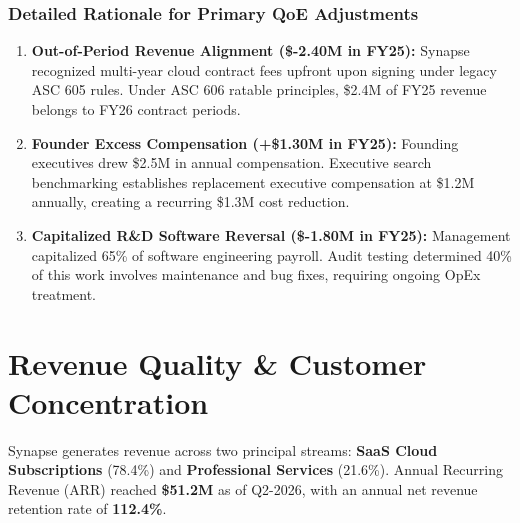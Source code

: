 \documentclass[10pt,a4paper,oneside]{scrreprt}
\begin{document}
\vspace{0.02cm}

\subsection*{Detailed Rationale for Primary QoE Adjustments}

\begin{enumerate}[label=\textbf{\arabic*.}, leftmargin=1.4em, itemsep=0.5pt, parsep=0pt]
  \item \textbf{Out-of-Period Revenue Alignment (\$-2.40M in FY25):} Synapse recognized multi-year cloud contract fees upfront upon signing under legacy ASC 605 rules. Under ASC 606 ratable principles, \$2.4M of FY25 revenue belongs to FY26 contract periods.
  \item \textbf{Founder Excess Compensation (+\$1.30M in FY25):} Founding executives drew \$2.5M in annual compensation. Executive search benchmarking establishes replacement executive compensation at \$1.2M annually, creating a recurring \$1.3M cost reduction.
  \item \textbf{Capitalized R\&D Software Reversal (\$-1.80M in FY25):} Management capitalized 65\% of software engineering payroll. Audit testing determined 40\% of this work involves maintenance and bug fixes, requiring ongoing OpEx treatment.
\end{enumerate}

\vspace{0.04cm}

\chapter{Revenue Quality \& Customer Concentration}

Synapse generates revenue across two principal streams: \textbf{SaaS Cloud Subscriptions} (78.4\%) and \textbf{Professional Services} (21.6\%). Annual Recurring Revenue (ARR) reached \textbf{\$51.2M} as of Q2-2026, with an annual net revenue retention rate of \textbf{112.4\%}.
\end{document}
